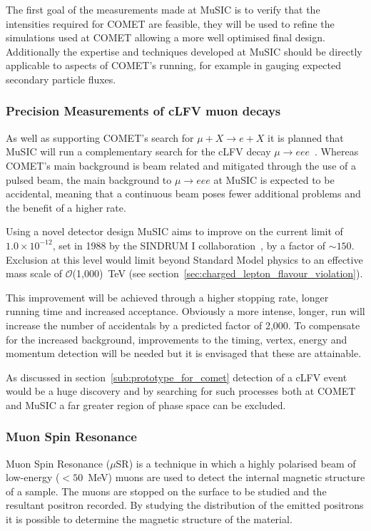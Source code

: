The first goal of the measurements made at MuSIC is to verify that the intensities required for COMET are feasible, they will be used to refine the simulations used at COMET allowing a more well optimised final design. Additionally the expertise and techniques developed at MuSIC should be directly applicable to aspects of COMET's running, for example in gauging expected secondary particle fluxes.

\subsubsection{Precision Measurements of cLFV muon decays} %
\label{sub:precision_measurements_of_clfv_muon_decays}
As well as supporting COMET's search for \( \mu + X \rightarrow e + X \) it is planned that MuSIC will run a complementary search for the cLFV decay \( \mu \rightarrow eee \)~\cite{music_cdr}. Whereas COMET's main background is beam related and mitigated through the use of a pulsed beam, the main background to \( \mu \rightarrow eee \) at MuSIC is expected to be accidental, meaning that a continuous beam poses fewer additional problems and the benefit of a higher rate.

Using a novel detector design MuSIC aims to improve on the current limit of \( 1.0\times10^{-12} \), set in 1988 by the SINDRUM I collaboration~\cite{sindrum_1_mu_eee}, by a factor of \( \sim150 \). Exclusion at this level would limit beyond Standard Model physics to an effective mass scale of \( \mathcal{O}\)(1,000)~TeV (see section~\ref{sec:charged_lepton_flavour_violation}).

This improvement will be achieved through a higher stopping rate, longer running time and increased acceptance. Obviously a more intense, longer, run will increase the number of accidentals by a predicted factor of 2,000. To compensate for the increased background, improvements to the timing, vertex, energy and momentum detection will be needed but it is envisaged that these are attainable.

As discussed in section~\ref{sub:prototype_for_comet} detection of a cLFV event would be a huge discovery and by searching for such processes both at COMET and MuSIC a far greater region of phase space can be excluded. 

\subsubsection{Muon Spin Resonance} %
\label{sub:muon_spin_resonance}
Muon Spin Resonance (\( \mu \)SR) is a technique in which a highly polarised beam of low-energy (\( <50 \)~MeV) muons are used to detect the internal magnetic structure of a sample. The muons are stopped on the surface to be studied and the resultant positron recorded. By studying the distribution of the emitted positrons it is possible to determine the magnetic structure of the material. 

